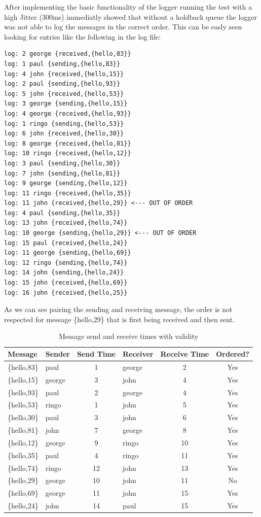 \documentclass[a4paper, 11pt]{article}
\begin{document}
After implementing the basic functionality of the logger running the test with a high Jitter (300ms) immediatly showed that without a holdback queue the logger was not able to log the messages in the correct order. This can be easly seen looking for entries like the following in the log file:
\begin{tcolorbox}[colback=black!5!white, colframe=black!80!white, title=Log Output, fonttitle=\bfseries, sharp corners=south, listing only]
\begin{verbatim}
log: 2 george {received,{hello,83}}
log: 1 paul {sending,{hello,83}}
log: 4 john {received,{hello,15}}
log: 2 paul {sending,{hello,93}}
log: 5 john {received,{hello,53}}
log: 3 george {sending,{hello,15}}
log: 4 george {received,{hello,93}}
log: 1 ringo {sending,{hello,53}}
log: 6 john {received,{hello,30}}
log: 8 george {received,{hello,81}}
log: 10 ringo {received,{hello,12}}
log: 3 paul {sending,{hello,30}}
log: 7 john {sending,{hello,81}}
log: 9 george {sending,{hello,12}}
log: 11 ringo {received,{hello,35}}
log: 11 john {received,{hello,29}} <--- OUT OF ORDER
log: 4 paul {sending,{hello,35}}
log: 13 john {received,{hello,74}}
log: 10 george {sending,{hello,29}} <--- OUT OF ORDER
log: 15 paul {received,{hello,24}}
log: 11 george {sending,{hello,69}}
log: 12 ringo {sending,{hello,74}}
log: 14 john {sending,{hello,24}}
log: 15 john {received,{hello,69}}
log: 16 john {received,{hello,25}}
\end{verbatim}
\end{tcolorbox}

As we can see pairing the sending and receiving message, the order is not respected for 
message \{hello,29\} that is first being received and then sent. 

\begin{table}[H]
\centering
\begin{tabular}{|l|l|c|l|c|c|}
\hline
\textbf{Message} & \textbf{Sender} & \textbf{Send Time} & \textbf{Receiver} & \textbf{Receive Time} & \textbf{Ordered?} \\
\hline
\{hello,83\}  & paul   & 1  & george & 2  & Yes \\
\{hello,15\}  & george & 3  & john   & 4  & Yes \\
\{hello,93\}  & paul   & 2  & george & 4  & Yes \\
\{hello,53\}  & ringo  & 1  & john   & 5  & Yes \\
\{hello,30\}  & paul   & 3  & john   & 6  & Yes \\
\{hello,81\}  & john   & 7  & george & 8  & Yes \\
\{hello,12\}  & george & 9  & ringo  & 10 & Yes \\
\{hello,35\}  & paul   & 4  & ringo  & 11 & Yes \\
\{hello,74\}  & ringo  & 12 & john   & 13 & Yes \\
\{hello,29\}  & george & 10 & john   & 11 & No  \\
\{hello,69\}  & george & 11 & john   & 15 & Yes \\
\{hello,24\}  & john   & 14 & paul   & 15 & Yes \\
\hline
\end{tabular}
\caption{Message send and receive times with validity}
\end{table}
\end{document}
